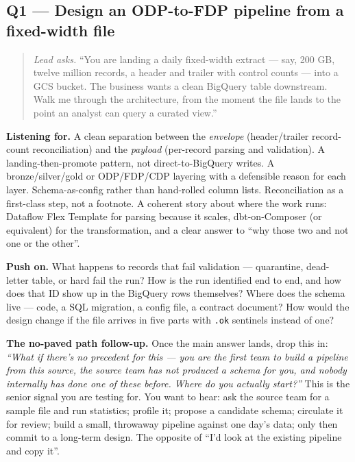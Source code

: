 \documentclass[
  11pt,
  british,
  oneside]{book}
\begin{document}
\hypertarget{q1-design-an-odp-to-fdp-pipeline-from-a-fixed-width-file}{%
\subsection{Q1 --- Design an ODP-to-FDP pipeline from a fixed-width
file}\label{q1-design-an-odp-to-fdp-pipeline-from-a-fixed-width-file}}

\begin{quote}
\emph{Lead asks.} ``You are landing a daily fixed-width extract --- say,
200 GB, twelve million records, a header and trailer with control counts
--- into a GCS bucket. The business wants a clean BigQuery table
downstream. Walk me through the architecture, from the moment the file
lands to the point an analyst can query a curated view.''
\end{quote}

\textbf{Listening for.} A clean separation between the \emph{envelope}
(header/trailer record-count reconciliation) and the
\emph{payload} (per-record parsing and validation). A
landing-then-promote pattern, not direct-to-BigQuery writes. A
bronze/silver/gold or ODP/FDP/CDP layering with a defensible reason for
each layer. Schema-as-config rather than hand-rolled column lists.
Reconciliation as a first-class step, not a footnote. A coherent story
about where the work runs: Dataflow Flex Template for parsing because it
scales, dbt-on-Composer (or equivalent) for the transformation, and a
clear answer to ``why those two and not one or the other''.

\textbf{Push on.} What happens to records that fail validation ---
quarantine, dead-letter table, or hard fail the run? How is the run
identified end to end, and how does that ID show up in the BigQuery rows
themselves? Where does the schema live --- code, a SQL
migration, a config file, a contract document? How would the design
change if the file arrives in five parts with \texttt{.ok} sentinels
instead of one?

\textbf{The no-paved path follow-up.} Once the main answer lands, drop
this in: \emph{``What if there's no precedent for this --- you are the
first team to build a pipeline from this source, the source team has not
produced a schema for you, and nobody internally has done one of these
before. Where do you actually start?''} This is the senior signal you
are testing for. You want to hear: ask the source team for a sample file
and run statistics; profile it; propose a candidate schema; circulate it
for review; build a small, throwaway pipeline against one day's data;
only then commit to a long-term design. The opposite of ``I'd look at
the existing pipeline and copy it''.
\end{document}
